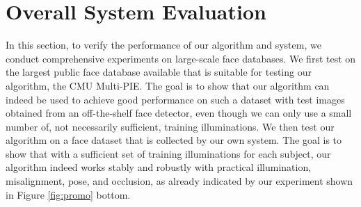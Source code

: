 \section{Overall System Evaluation}\label{sec:experiment}\vspace{0mm}
In this section, to verify the performance of our algorithm and system, we conduct comprehensive experiments on large-scale face databases. We first test on the largest public face database available that is suitable for testing our algorithm, the CMU Multi-PIE. The goal is to show that our algorithm can indeed be used to achieve good performance on such a dataset with test images obtained from an off-the-shelf face detector, even though we can only use a small number of, not necessarily sufficient, training illuminations. We then test our algorithm on a face dataset that is collected by our own system. The goal is to show that with a sufficient set of training illuminations for each subject, our algorithm indeed works stably and robustly with practical illumination, misalignment, pose, and occlusion, as already indicated by our experiment shown in Figure \ref{fig:promo} bottom.

